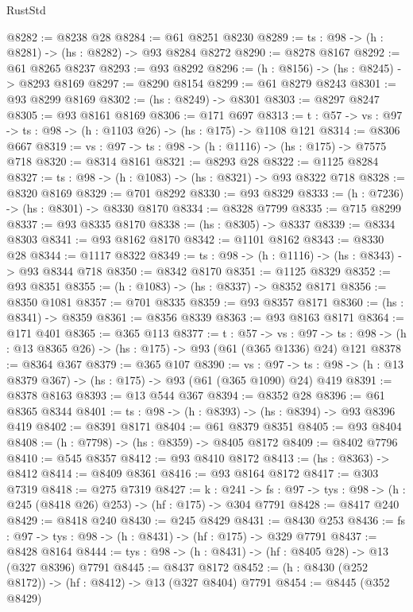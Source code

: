 \begin{lexlean}{RustStd}
\begin{coremodule}
@8282 := @8238 @28
@8284 := @61 @8251 @8230
@8289 := {ts : @98} -> (h : @8281) -> (hs : @8282) -> @93 @8284 @8272
@8290 := @8278 @8167
@8292 := @61 @8265 @8237
@8293 := @93 @8292
@8296 := (h : @8156) -> (hs : @8245) -> @8293 @8169
@8297 := @8290 @8154
@8299 := @61 @8279 @8243
@8301 := @93 @8299 @8169
@8302 := (hs : @8249) -> @8301
@8303 := @8297 @8247
@8305 := @93 @8161 @8169
@8306 := @171 @697
@8313 := {t : @57} -> {vs : @97} -> {ts : @98} -> (h : @1103 @26) -> (hs : @175) -> @1108 @121
@8314 := @8306 @667
@8319 := {vs : @97} -> {ts : @98} -> (h : @1116) -> (hs : @175) -> @7575 @718
@8320 := @8314 @8161
@8321 := @8293 @28
@8322 := @1125 @8284
@8327 := {ts : @98} -> (h : @1083) -> (hs : @8321) -> @93 @8322 @718
@8328 := @8320 @8169
@8329 := @701 @8292
@8330 := @93 @8329
@8333 := (h : @7236) -> (hs : @8301) -> @8330 @8170
@8334 := @8328 @7799
@8335 := @715 @8299
@8337 := @93 @8335 @8170
@8338 := (hs : @8305) -> @8337
@8339 := @8334 @8303
@8341 := @93 @8162 @8170
@8342 := @1101 @8162
@8343 := @8330 @28
@8344 := @1117 @8322
@8349 := {ts : @98} -> (h : @1116) -> (hs : @8343) -> @93 @8344 @718
@8350 := @8342 @8170
@8351 := @1125 @8329
@8352 := @93 @8351
@8355 := (h : @1083) -> (hs : @8337) -> @8352 @8171
@8356 := @8350 @1081
@8357 := @701 @8335
@8359 := @93 @8357 @8171
@8360 := (hs : @8341) -> @8359
@8361 := @8356 @8339
@8363 := @93 @8163 @8171
@8364 := @171 @401
@8365 := @365 @113
@8377 := {t : @57} ->
  {vs : @97} -> {ts : @98} -> (h : @13 @8365 @26) -> (hs : @175) -> @93 (@61 (@365 @1336) @24) @121
@8378 := @8364 @367
@8379 := @365 @107
@8390 := {vs : @97} ->
  {ts : @98} -> (h : @13 @8379 @367) -> (hs : @175) -> @93 (@61 (@365 @1090) @24) @419
@8391 := @8378 @8163
@8393 := @13 @544 @367
@8394 := @8352 @28
@8396 := @61 @8365 @8344
@8401 := {ts : @98} -> (h : @8393) -> (hs : @8394) -> @93 @8396 @419
@8402 := @8391 @8171
@8404 := @61 @8379 @8351
@8405 := @93 @8404
@8408 := (h : @7798) -> (hs : @8359) -> @8405 @8172
@8409 := @8402 @7796
@8410 := @545 @8357
@8412 := @93 @8410 @8172
@8413 := (hs : @8363) -> @8412
@8414 := @8409 @8361
@8416 := @93 @8164 @8172
@8417 := @303 @7319
@8418 := @275 @7319
@8427 := {k : @241} ->
  {fs : @97} -> {tys : @98} -> (h : @245 (@8418 @26) @253) -> (hf : @175) -> @304 @7791
@8428 := @8417 @240
@8429 := @8418 @240
@8430 := @245 @8429
@8431 := @8430 @253
@8436 := {fs : @97} -> {tys : @98} -> (h : @8431) -> (hf : @175) -> @329 @7791
@8437 := @8428 @8164
@8444 := {tys : @98} -> (h : @8431) -> (hf : @8405 @28) -> @13 (@327 @8396) @7791
@8445 := @8437 @8172
@8452 := (h : @8430 (@252 @8172)) -> (hf : @8412) -> @13 (@327 @8404) @7791
@8454 := @8445 (@352 @8429)

\end{coremodule}
\end{lexlean}
